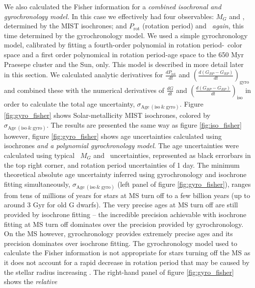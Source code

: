 We also calculated the Fisher information for a {\it combined isochronal and
gyrochronology model.}
In this case we effectively had four observables: $M_G$ and \gcolor,
determined by the MIST isochrones; and $P_{\mathrm{rot}}$ (rotation period)
and \gcolor\ {\it again}, this time determined by the gyrochronology model.
We used a simple gyrochronology model, calibrated by fitting a fourth-order
polynomial in rotation period-\Gaia\ color space and a first order polynomical
in rotation period-age space to the 650 Myr Praesepe cluster and the Sun,
only.
This model is described in more detail later in this section.
We calculated analytic derivatives for $\frac{dP_{\mathrm{rot}}}{dt}$ and
$\left(\frac{d(G_{BP} - G_{RP})}{dt}\right)_{\mathrm{gyro}}$ and combined
these with the numerical derivatives of $\frac{dG}{dt}$ and
$\left(\frac{d(G_{BP} - G_{RP})}{dt}\right)_{\mathrm{iso}}$ in order to
calculate the total age uncertainty, $\sigma_{\mathrm{Age~(iso~\&~gyro)}}$.
Figure \ref{fig:gyro_fisher} shows Solar-metallicity MIST isochrones, colored
by $\sigma_{\mathrm{Age~(iso~\&~gyro)}}$.
The results are presented the same way as figure \ref{fig:iso_fisher} however,
figure \ref{fig:gyro_fisher} shows age uncertainties calculated using
isochrones {\it and a polynomial gyrochronology model}.
The age uncertainties were calculated using typical \Gaia\ $M_G$ and \gcolor\
uncertainties, represented as black errorbars in the top right corner, and
rotation period uncertainties of 1 day.
The minimum theoretical absolute age uncertainty inferred using gyrochronology
and isochrone fitting simultaneously, $\sigma_{\mathrm{Age~(iso~\&~gyro)}}$
(left panel of figure \ref{fig:gyro_fisher}), ranges from tens of millions of
years for stars at MS turn off to a few billion years (up to around 3 Gyr for
old G dwarfs).
The very precise ages at MS turn off are still provided by isochrone fitting
-- the incredible precision achievable with isochrone fitting at MS turn off
dominates over the precision provided by gyrochronology.
On the MS however, gyrochronology provides extremely precise ages and its
precision dominates over isochrone fitting.
The gyrochronology model used to calculate the Fisher information is not
appropriate for stars turning off the MS as it does not account for a rapid
decrease in rotation period that may be caused by the stellar radius
increasing \citep[see][]{vansaders2013}.
The right-hand panel of figure \ref{fig:gyro_fisher} shows the {\it relative}
